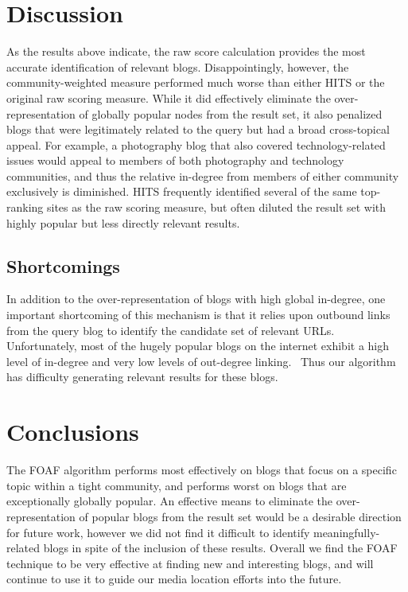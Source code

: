 \documentclass{sig-alternate-nocopyright}
\begin{document}
\section{Discussion}
As the results above indicate, the raw score calculation provides the
most accurate identification of relevant blogs.  Disappointingly,
however, the community-weighted measure performed much worse than
either HITS or the original raw scoring measure.  While it did
effectively eliminate the over-representation of globally popular
nodes from the result set, it also penalized blogs that were
legitimately related to the query but had a broad cross-topical
appeal.  For example, a photography blog that also covered
technology-related issues would appeal to members of both photography
and technology communities, and thus the relative in-degree from
members of either community exclusively is diminished.  HITS
frequently identified several of the same top-ranking sites as the raw
scoring measure, but often diluted the result set with highly popular
but less directly relevant results.

\subsection{Shortcomings}
In addition to the over-representation of blogs with high global
in-degree, one important shortcoming of this mechanism is that it
relies upon outbound links from the query blog to identify the
candidate set of relevant URLs.  Unfortunately, most of the hugely
popular blogs on the internet exhibit a high level of in-degree and
very low levels of out-degree linking.~\cite{convBlog}  Thus our algorithm has
difficulty generating relevant results for these blogs.

\section{Conclusions}


The FOAF algorithm performs most effectively on blogs that focus on a
specific topic within a tight community, and performs worst on blogs
that are exceptionally globally popular.  An effective
means to eliminate the over-representation of popular blogs from the
result set would be a desirable direction for future work, however we
did not find it difficult to identify meaningfully-related
blogs in spite of the inclusion of these results. Overall we find the
FOAF technique to be very effective at finding new and interesting
blogs, and will continue to use it to guide our media location efforts
into the future.
\end{document}
